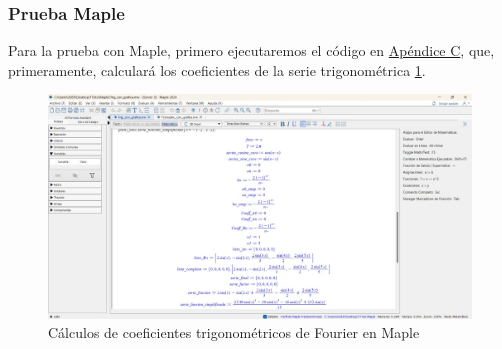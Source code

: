 \subsubsection{Prueba Maple}
Para la prueba con Maple, primero ejecutaremos el código en \hyperref[app3:trig-code-maple]{Apéndice C}, que, primeramente, calculará los coeficientes de la serie trigonométrica \ref{fig:maple-trig-series}. 
\begin{figure}[H]
	\centering
	\includegraphics[width=1\textwidth]{img/chapter02/maple-trig-series-coeff.jpeg}
	\caption{Cálculos de coeficientes trigonométricos de Fourier en Maple}
	\label{fig:maple-trig-series}  %
\end{figure}


